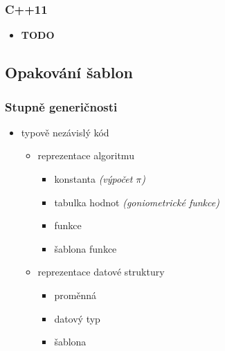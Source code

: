 \begin{frame} \frametitle{C++11}
	\begin{itemize}
		\item{\textbf{TODO}}
	\end{itemize}
\end{frame}

\subsection{Opakování šablon}

\begin{frame} \frametitle{Stupně generičnosti}
	\begin{itemize}
		\item{typově nezávislý kód}
		\begin{itemize}
			\item{reprezentace algoritmu}
			\begin{itemize}
				\item{konstanta \textit{(výpočet $\pi$)}} \pause
				\item{tabulka hodnot \textit{(goniometrické funkce)}} \pause
				\item{funkce} \pause
				\item{šablona funkce} \pause
			\end{itemize}
			\item{reprezentace datové struktury}
			\begin{itemize}
				\item{proměnná} \pause
				\item{datový typ} \pause
				\item{šablona}
			\end{itemize}
		\end{itemize}
	\end{itemize}
\end{frame}

